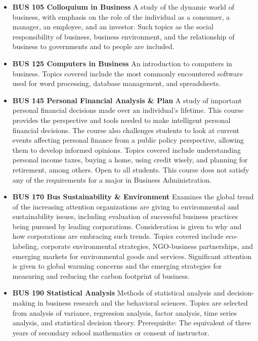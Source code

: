 \documentclass[
  letterpaper,
]{scrbook}
\providecommand{\tightlist}{%
  \setlength{\itemsep}{0pt}\setlength{\parskip}{0pt}}
\begin{document}
\begin{itemize}
\tightlist
\item
  \textbf{BUS 105 Colloquium in Business} A study of the dynamic world
  of business, with emphasis on the role of the individual as a
  consumer, a manager, an employee, and an investor. Such topics as the
  social responsibility of business, business environment, and the
  relationship of business to governments and to people are included.
\item
  \textbf{BUS 125 Computers in Business} An introduction to computers in
  business. Topics covered include the most commonly encountered
  software used for word processing, database management, and
  spreadsheets.
\item
  \textbf{BUS 145 Personal Financial Analysis \& Plan} A study of
  important personal financial decisions made over an individual's
  lifetime. This course provides the perspective and tools needed to
  make intelligent personal financial decisions. The course also
  challenges students to look at current events affecting personal
  finance from a public policy perspective, allowing them to develop
  informed opinions. Topics covered include understanding personal
  income taxes, buying a home, using credit wisely, and planning for
  retirement, among others. Open to all students. This course does not
  satisfy any of the requirements for a major in Business
  Administration.
\item
  \textbf{BUS 170 Bus Sustainability \& Environment} Examines the global
  trend of the increasing attention organizations are giving to
  environmental and sustainability issues, including evaluation of
  successful business practices being pursued by leading corporations.
  Consideration is given to why and how corporations are embracing such
  trends. Topics covered include eco-labeling, corporate environmental
  strategies, NGO-business partnerships, and emerging markets for
  environmental goods and services. Significant attention is given to
  global warming concerns and the emerging strategies for measuring and
  reducing the carbon footprint of business.
\item
  \textbf{BUS 190 Statistical Analysis} Methods of statistical analysis
  and decision-making in business research and the behavioral sciences.
  Topics are selected from analysis of variance, regression analysis,
  factor analysis, time series analysis, and statistical decision
  theory. Prerequisite: The equivalent of three years of secondary
  school mathematics or consent of instructor.

\end{itemize}
\end{document}

